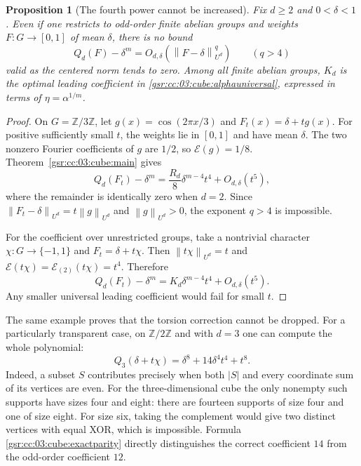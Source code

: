 \documentclass[11pt,letterpaper]{article}
\numberwithin{equation}{section}
\newtheorem{proposition}[theorem]{Proposition}
\theoremstyle{definition}
\theoremstyle{remark}
\newcommand{\Z}{\mathbb Z}
\newcommand{\1}{\mathbf 1}
\newcommand{\norm}[1]{\left\|#1\right\|}
\begin{document}
\begin{proposition}[The fourth power cannot be increased]
\label{gsr:cc:03:cube:sharporder}
Fix $d\geq2$ and $0<\delta<1$.  Even if one restricts to odd-order
finite abelian groups and weights $F:G\to[0,1]$ of mean $\delta$,
there is no bound
\[
 Q_d(F)-\delta^m=O_{d,\delta}(\norm{F-\delta}_{U^d}^{q})
 \qquad(q>4)
\]
valid as the centered norm tends to zero.  Among all finite abelian
groups, $K_d$ is the optimal leading coefficient in
\eqref{gsr:cc:03:cube:alphauniversal}, expressed in terms of
$\eta=\alpha^{1/m}$.
\end{proposition}

\begin{proof}
On $G=\Z/3\Z$, let $g(x)=\cos(2\pi x/3)$ and
$F_t(x)=\delta+t g(x)$.  For positive sufficiently small $t$, the
weights lie in $[0,1]$ and have mean $\delta$.  The two nonzero Fourier
coefficients of $g$ are $1/2$, so $\mathcal E(g)=1/8$.
Theorem~\ref{gsr:cc:03:cube:main} gives
\begin{equation}
 Q_d(F_t)-\delta^m
 =\frac{R_d}{8}\delta^{m-4}t^4+O_{d,\delta}(t^5),
 \label{gsr:cc:03:cube:cosine}
\end{equation}
where the remainder is identically zero when $d=2$.
Since $\norm{F_t-\delta}_{U^d}=t\norm g_{U^d}$ and
$\norm g_{U^d}>0$, the exponent $q>4$ is impossible.

For the coefficient over unrestricted groups, take a nontrivial
character $\chi:G\to\{-1,1\}$ and $F_t=\delta+t\chi$.
Then $\norm{t\chi}_{U^d}=t$ and
$\mathcal E(t\chi)=\mathcal E_{(2)}(t\chi)=t^4$.
Therefore
\begin{equation}
 Q_d(F_t)-\delta^m
 =K_d\delta^{m-4}t^4+O_{d,\delta}(t^5).
 \label{gsr:cc:03:cube:paritysharp}
\end{equation}
Any smaller universal leading coefficient would fail for small $t$.
\end{proof}

The same example proves that the torsion correction cannot be dropped.
For a particularly transparent case, on $\Z/2\Z$ and with $d=3$ one
can compute the whole polynomial:
\begin{equation}
 Q_3(\delta+t\chi)=\delta^8+14\delta^4t^4+t^8.
 \label{gsr:cc:03:cube:exactparity}
\end{equation}
Indeed, a subset $S$ contributes precisely when both $|S|$ and every
coordinate sum of its vertices are even.  For the three-dimensional
cube the only nonempty such supports have sizes four and eight:
there are fourteen supports of size four and one of size eight.
For size six, taking the complement would give two distinct vertices
with equal XOR, which is impossible.  Formula
\eqref{gsr:cc:03:cube:exactparity} directly distinguishes the correct coefficient
$14$ from the odd-order coefficient $12$.
\end{document}
